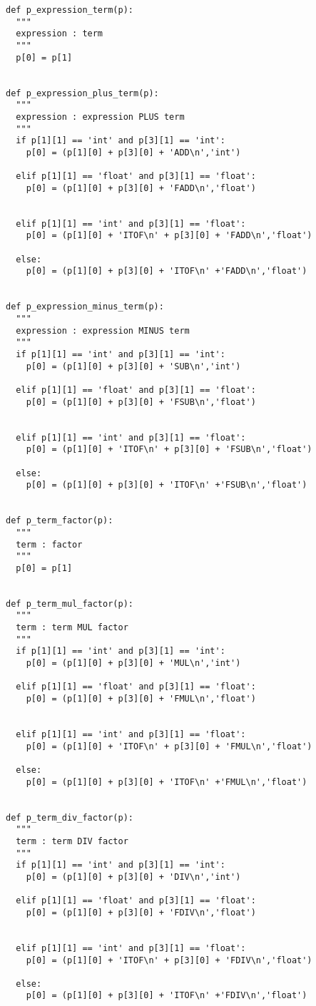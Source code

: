 \documentclass[11pt,a4paper]{report}%
\begin{document}
\begin{scriptsize}
\begin{verbatim}
def p_expression_term(p):
  """
  expression : term
  """
  p[0] = p[1]


def p_expression_plus_term(p):
  """
  expression : expression PLUS term
  """
  if p[1][1] == 'int' and p[3][1] == 'int':
    p[0] = (p[1][0] + p[3][0] + 'ADD\n','int')
  
  elif p[1][1] == 'float' and p[3][1] == 'float':
    p[0] = (p[1][0] + p[3][0] + 'FADD\n','float')

  
  elif p[1][1] == 'int' and p[3][1] == 'float':
    p[0] = (p[1][0] + 'ITOF\n' + p[3][0] + 'FADD\n','float')
  
  else:
    p[0] = (p[1][0] + p[3][0] + 'ITOF\n' +'FADD\n','float')


def p_expression_minus_term(p):
  """
  expression : expression MINUS term
  """
  if p[1][1] == 'int' and p[3][1] == 'int':
    p[0] = (p[1][0] + p[3][0] + 'SUB\n','int')
  
  elif p[1][1] == 'float' and p[3][1] == 'float':
    p[0] = (p[1][0] + p[3][0] + 'FSUB\n','float')

  
  elif p[1][1] == 'int' and p[3][1] == 'float':
    p[0] = (p[1][0] + 'ITOF\n' + p[3][0] + 'FSUB\n','float')
  
  else:
    p[0] = (p[1][0] + p[3][0] + 'ITOF\n' +'FSUB\n','float')


def p_term_factor(p):
  """
  term : factor
  """
  p[0] = p[1]


def p_term_mul_factor(p):
  """
  term : term MUL factor
  """
  if p[1][1] == 'int' and p[3][1] == 'int':
    p[0] = (p[1][0] + p[3][0] + 'MUL\n','int')
  
  elif p[1][1] == 'float' and p[3][1] == 'float':
    p[0] = (p[1][0] + p[3][0] + 'FMUL\n','float')

  
  elif p[1][1] == 'int' and p[3][1] == 'float':
    p[0] = (p[1][0] + 'ITOF\n' + p[3][0] + 'FMUL\n','float')
  
  else:
    p[0] = (p[1][0] + p[3][0] + 'ITOF\n' +'FMUL\n','float')


def p_term_div_factor(p):
  """
  term : term DIV factor
  """
  if p[1][1] == 'int' and p[3][1] == 'int':
    p[0] = (p[1][0] + p[3][0] + 'DIV\n','int')
  
  elif p[1][1] == 'float' and p[3][1] == 'float':
    p[0] = (p[1][0] + p[3][0] + 'FDIV\n','float')

  
  elif p[1][1] == 'int' and p[3][1] == 'float':
    p[0] = (p[1][0] + 'ITOF\n' + p[3][0] + 'FDIV\n','float')
  
  else:
    p[0] = (p[1][0] + p[3][0] + 'ITOF\n' +'FDIV\n','float')



\end{verbatim}
\end{scriptsize}
\end{document}
